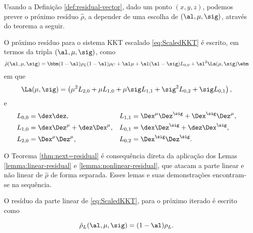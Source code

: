 Usando a Definição \ref{def:residual-vector}, dado um ponto  $(x,y,z)$, podemos 
prever o próximo resíduo $\hat{\rho}$, a depender de uma escolha de 
$(\al,\mu,\sig)$, através do teorema a seguir. 

\begin{teo}
\label{thm:next=residual}
O próximo resíduo para o sistema KKT escalado  \eqref{eq:ScaledKKT} é escrito, em
termos da tripla $(\al,\mu,\sig)$, como 
\begin{equation}
\label{eq:next-residual-all}
\hat{\rho}(\al,\mu,\sig) = \bbm (1-\al)\rho_L \\   (1-\al)\rho_C+ \al\mu + \al(\al-\sig)L_{0,0} +  
\al^2 \La(\mu,\sig) \ebm
\end{equation}
em que 
\begin{equation}
\label{eq:Lambda-mu-sigma}
\La(\mu,\sig) = \left(\mu^2
 L_{2,0} + \mu L_{1,0} + \mu \sig L_{1,1} + \sig^2L_{0,2} + \sig
 L_{0,1}\right),
\end{equation}
e
\begin{equation}
\label{eq:defining-Lij}
\begin{aligned}
	L_{0,0} & = \dex\dez, & L_{1,1}  & = \Dex^\mu\Dez^\sig +
			\Dex^\sig\Dez^\mu, \\	
	L_{1,0} &  = \dex\Dez^\mu +
			\dez\Dex^\mu,  & L_{0,1}  & = \dex\Dez^\sig + \dez\Dex^\sig, \\	
	L_{2,0} &  = \Dex^\mu\Dez^\mu,  & L_{0,2}  & = \Dex^\sig\Dez^\sig .\\	
\end{aligned}
\end{equation}

\end{teo}

O Teorema \ref{thm:next=residual} é consequência direta da aplicação
dos Lemas \ref{lemma:linear-residual} e \ref{lemma:nonlinear-residual}, que
atacam a parte linear e não linear de  $\hat{\rho}$ de forma separada. Esses lemas
e suas demonstrações encontram-se na sequência. %
 
\begin{lema}\label{lemma:linear-residual}
O resíduo da parte linear de  \eqref{eq:ScaledKKT}, para o próximo iterado é
escrito como

\[
\hat{\rho}_L(\al,\mu,\sig) = (1-\al)\rho_L.
\]
 
\end{lema}

